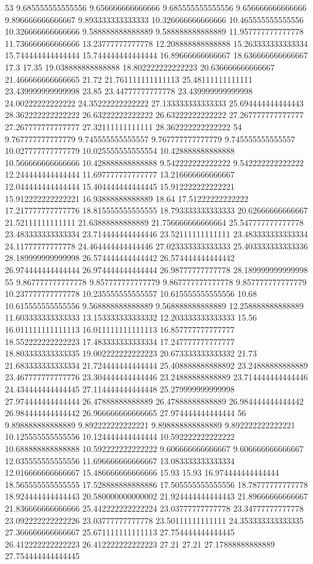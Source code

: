 53 9.685555555555556 9.656666666666666 9.685555555555556 9.656666666666666 9.896666666666667 9.893333333333333 10.326666666666666 10.465555555555556 10.326666666666666 9.588888888888889 9.588888888888889 11.957777777777778 11.736666666666666 13.23777777777778 12.208888888888888 15.263333333333334 15.744444444444444 15.744444444444444 16.89666666666667 18.636666666666667 17.3 17.35 19.038888888888888 18.802222222222223 20.636666666666667 21.466666666666665 21.72 21.761111111111113 25.48111111111111 23.439999999999998 23.85 23.44777777777778 23.439999999999998 24.00222222222222 24.35222222222222 27.133333333333333 25.694444444444443 28.362222222222222 26.63222222222222 26.63222222222222 27.267777777777777 27.267777777777777 27.32111111111111 28.362222222222222
54 9.767777777777779 9.745555555555557 9.767777777777779 9.745555555555557 10.027777777777779 10.025555555555554 10.428888888888888 10.566666666666666 10.428888888888888 9.542222222222222 9.542222222222222 12.244444444444444 11.697777777777777 13.216666666666667 12.044444444444444 15.404444444444445 15.912222222222221 15.912222222222221 16.93888888888889 18.64 17.51222222222222 17.217777777777776 18.815555555555555 18.793333333333333 20.62666666666667 21.52111111111111 21.63888888888889 21.756666666666664 25.547777777777778 23.483333333333334 23.714444444444446 23.52111111111111 23.483333333333334 24.11777777777778 24.464444444444446 27.023333333333333 25.403333333333336 28.189999999999998 26.574444444444442 26.574444444444442 26.974444444444444 26.974444444444444 26.98777777777778 28.189999999999998
55 9.867777777777778 9.857777777777779 9.867777777777778 9.857777777777779 10.237777777777778 10.235555555555557 10.615555555555556 10.68 10.615555555555556 9.568888888888889 9.568888888888889 12.258888888888889 11.603333333333333 13.153333333333332 12.203333333333333 15.56 16.011111111111113 16.011111111111113 16.857777777777777 18.552222222222223 17.483333333333334 17.247777777777777 18.803333333333335 19.002222222222223 20.673333333333332 21.73 21.683333333333334 21.724444444444444 25.408888888888892 23.24888888888889 23.467777777777776 23.304444444444446 23.24888888888889 23.714444444444446 24.434444444444445 27.114444444444448 25.279999999999998 27.974444444444444 26.47888888888889 26.47888888888889 26.984444444444442 26.984444444444442 26.966666666666665 27.974444444444444
56 9.898888888888889 9.892222222222221 9.898888888888889 9.892222222222221 10.125555555555556 10.124444444444444 10.592222222222222 10.688888888888888 10.592222222222222 9.606666666666667 9.606666666666667 12.035555555555556 11.696666666666667 13.083333333333334 12.016666666666667 15.486666666666666 15.93 15.93 16.974444444444444 18.565555555555555 17.528888888888886 17.505555555555556 18.78777777777778 18.924444444444443 20.580000000000002 21.924444444444443 21.89666666666667 21.836666666666666 25.442222222222224 23.03777777777778 23.34777777777778 23.092222222222226 23.03777777777778 23.50111111111111 24.353333333333335 27.366666666666667 25.671111111111113 27.754444444444445 26.412222222222223 26.412222222222223 27.21 27.21 27.17888888888889 27.754444444444445
